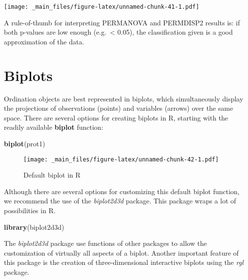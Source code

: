 \documentclass[12pt,]{book}
\newenvironment{Shaded}{\begin{snugshade}}{\end{snugshade}}
\newcommand{\KeywordTok}[1]{\textcolor[rgb]{0.13,0.29,0.53}{\textbf{#1}}}
\newcommand{\NormalTok}[1]{#1}
\newcommand{\OperatorTok}[1]{\textcolor[rgb]{0.81,0.36,0.00}{\textbf{#1}}}
\begin{document}
\begin{Shaded}
\end{Shaded}

\texttt{[image: \_main\_files/figure-latex/unnamed-chunk-41-1.pdf]}

A rule-of-thumb for interpreting PERMANOVA and PERMDISP2 results is: if both p-values are low enough (e.g.~\textless{} 0.05), the classification given is a good approximation of the data.

\pagebreak

\hypertarget{biplot}{%
\section{Biplots}\label{biplot}}

Ordination objects are best represented in biplots, which simultaneously display the projections of observations (points) and variables (arrows) over the same space. There are several options for creating biplots in R, starting with the readily available \textbf{biplot} function:

\begin{Shaded}
\begin{Highlighting}[]
\KeywordTok{biplot}\NormalTok{(prot1)}
\end{Highlighting}
\end{Shaded}

\begin{figure}
\centering
\texttt{[image: \_main\_files/figure-latex/unnamed-chunk-42-1.pdf]}
\caption{\label{fig:unnamed-chunk-42}Default biplot in R}
\end{figure}

Although there are several options for customizing this default biplot function, we recommend the use of the \emph{biplot2d3d} package. This package wraps a lot of possibilities in R.

\begin{Shaded}
\begin{Highlighting}[]
\KeywordTok{library}\NormalTok{(biplot2d3d)}
\end{Highlighting}
\end{Shaded}

The \emph{biplot2d3d} package use functions of other packages to allow the customization of virtually all aspects of a biplot. Another important feature of this package is the creation of three-dimensional interactive biplots using the \emph{rgl} package.
\end{document}
